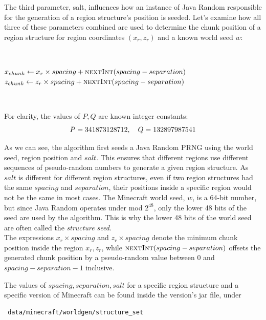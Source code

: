 \documentclass{article}
\begin{document}
The third parameter, salt, influences how an instance of Java Random responsible for the generation of a region structure's position is seeded. 
Let's examine how all three of these parameters combined are used to determine the chunk position of a region structure for region coordinates $(x_r, z_r)$ and a known world seed $w$:

\
\begin{algorithmic}
\State {}
\State $x_{chunk} \gets x_r \times spacing + \Call{nextInt}{spacing - separation}$
\State $z_{chunk} \gets z_r \times spacing + \Call{nextInt}{spacing - separation}$
\end{algorithmic}
\ \

\noindent For clarity, the values of $P, Q$ are known integer constants:
\begin{equation}\notag
    P = 341873128712, \quad Q = 132897987541
\end{equation}

As we can see, the algorithm first seeds a Java Random PRNG using the world seed, region position and $salt$. This ensures that different regions use different sequences of pseudo-random numbers to generate a given region structure. As $salt$ is different for different region structures, even if two region structures had the same $spacing$ and $separation$, their positions inside a specific region would not be the same in most cases. The Minecraft world seed, $w$, is a 64-bit number, but since Java Random operates under mod $2^{48}$, only the lower 48 bits of the seed are used by the algorithm. This is why the lower 48 bits of the world seed are often called the \emph{structure seed}. \\
The expressions $x_r \times spacing$ and $z_r \times spacing$ denote the minimum chunk position inside the region $x_r, z_r$, while $\Call{nextInt}{spacing - separation}$ offsets the generated chunk position by a pseudo-random value between 0 and $spacing - separation - 1$ inclusive.

The values of $spacing, separation, salt$ for a specific region structure and a specific version of Minecraft can be found inside the version's jar file, under 
\begin{verbatim} data/minecraft/worldgen/structure_set \end{verbatim}
\end{document}
